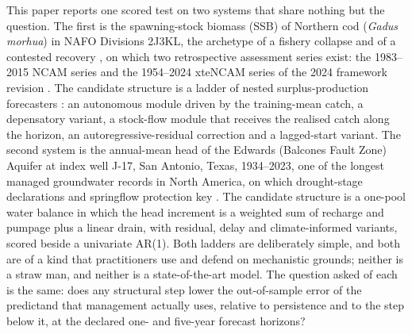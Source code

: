 \documentclass[preprint,11pt,authoryear]{elsarticle}
\theoremstyle{definition}
\theoremstyle{remark}
\begin{document}
This paper reports one scored test on two systems that share nothing but the question. The first is the spawning-stock biomass (SSB) of Northern cod (\emph{Gadus morhua}) in NAFO Divisions 2J3KL, the archetype of a fishery collapse \citep{Hutchings1994,Myers1997} and of a contested recovery \citep{RoseRowe2015,Rose2026}, on which two retrospective assessment series exist: the 1983--2015 NCAM series \citep{Cadigan2016,DFO2016} and the 1954--2024 xteNCAM series of the 2024 framework revision \citep{Regular2025}. The candidate structure is a ladder of nested surplus-production forecasters \citep{Schaefer1954,Pella1969}: an autonomous module driven by the training-mean catch, a depensatory variant, a stock-flow module that receives the realised catch along the horizon, an autoregressive-residual correction and a lagged-start variant. The second system is the annual-mean head of the Edwards (Balcones Fault Zone) Aquifer at index well J-17, San Antonio, Texas, 1934--2023, one of the longest managed groundwater records in North America, on which drought-stage declarations and springflow protection key \citep{EAA2024}. The candidate structure is a one-pool water balance in which the head increment is a weighted sum of recharge and pumpage plus a linear drain, with residual, delay and climate-informed variants, scored beside a univariate AR(1). Both ladders are deliberately simple, and both are of a kind that practitioners use and defend on mechanistic grounds; neither is a straw man, and neither is a state-of-the-art model. The question asked of each is the same: does any structural step lower the out-of-sample error of the predictand that management actually uses, relative to persistence and to the step below it, at the declared one- and five-year forecast horizons?
\end{document}
